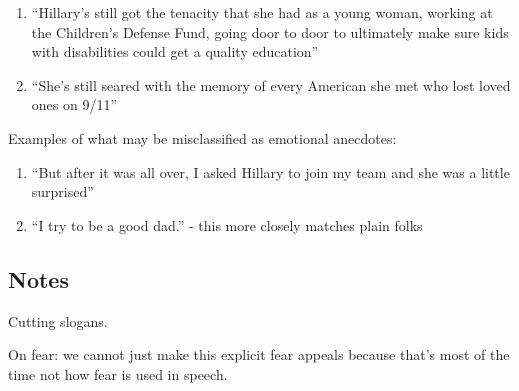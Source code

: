 \documentclass[letterpaper]{article}
\begin{document}
\begin{itemize}
	\begin{enumerate}
		\item ``Hillary’s still got the tenacity that she had as a young woman, working at the Children’s Defense Fund, going door to door to ultimately make sure kids with disabilities could get a quality education''
		\item ``She’s still seared with the memory of every American she met who lost loved ones on 9/11''
	\end{enumerate}
	Examples of what may be misclassified as emotional anecdotes: \\
	\begin{enumerate}
		\item ``But after it was all over, I asked Hillary to join my team and she was a little surprised''
		\item ``I try to be a good dad.'' - this more closely matches plain folks
	\end{enumerate}
\end{itemize}
\subsection*{Notes}
Cutting slogans.

On fear: we cannot just make this explicit fear appeals because that's most of the time not how fear is used in speech. 
\end{document}
